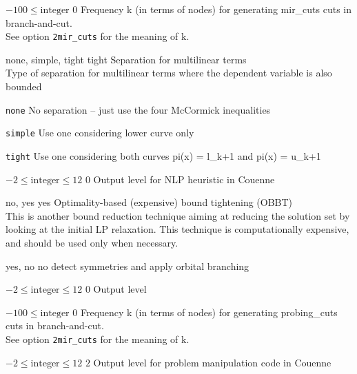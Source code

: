 %
{$-100\leq\textrm{integer}$}%
{$0$}%
{Frequency k (in terms of nodes) for generating mir\_cuts cuts in branch-and-cut.\\
See option \texttt{2mir\_cuts} for the meaning of k.}%
{}

%
{\ttfamily none, simple, tight}%
{tight}%
{Separation for multilinear terms\\
Type of separation for multilinear terms where the dependent variable is also bounded}%
{\begin{list}{}{
\setlength{\parsep}{0em}
\setlength{\leftmargin}{5ex}
\setlength{\labelwidth}{2ex}
\setlength{\itemindent}{0ex}
\setlength{\topsep}{0pt}}
\item[\texttt{none}] No separation -- just use the four McCormick inequalities
\item[\texttt{simple}] Use one considering lower curve only
\item[\texttt{tight}] Use one considering both curves pi(x) = l\_{k+1} and pi(x) = u\_{k+1}
\end{list}
}

%
{$-2\leq\textrm{integer}\leq12$}%
{$0$}%
{Output level for NLP heuristic in Couenne}%
{}

%
{\ttfamily no, yes}%
{yes}%
{Optimality-based (expensive) bound tightening (OBBT)\\
This is another bound reduction technique aiming at reducing the solution set by looking at the initial LP relaxation. This technique is computationally expensive, and should be used only when necessary.}%
{}

%
{\ttfamily yes, no}%
{no}%
{detect symmetries and apply orbital branching}%
{}

%
{$-2\leq\textrm{integer}\leq12$}%
{$0$}%
{Output level}%
{}

%
{$-100\leq\textrm{integer}$}%
{$0$}%
{Frequency k (in terms of nodes) for generating probing\_cuts cuts in branch-and-cut.\\
See option \texttt{2mir\_cuts} for the meaning of k.}%
{}

%
{$-2\leq\textrm{integer}\leq12$}%
{$2$}%
{Output level for problem manipulation code in Couenne}%
{}


